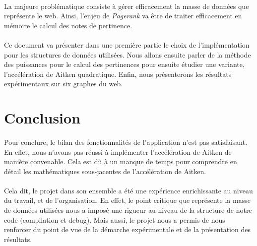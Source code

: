 		\paragraph{}La majeure problématique consiste à gérer efficacement la masse de données que représente le web. Ainsi, l'enjeu de \textit{Pagerank} va être de traiter efficacement en mémoire le calcul des notes de pertinence.
		\paragraph{}Ce document va présenter dans une première partie le choix de l'implémentation pour les structures de données utilisées. Nous allons ensuite parler de la méthode des puissances pour le calcul des pertinences pour ensuite étudier une variante, l'accélération de Aitken quadratique. Enfin, nous présenterons les résultats expérimentaux sur six graphes du web.
		
	
	
	
	
	
	\section*{Conclusion}
		\paragraph{}Pour conclure, le bilan des fonctionnalités de l'application n'est pas satisfaisant. En effet, nous n'avons pas réussi à implémenter l'accélération de Aitken de manière convenable. Cela est dû à un manque de temps pour comprendre en détail les mathématiques sous-jacentes de l'accélération de Aitken.
		\paragraph{}Cela dit, le projet dans son ensemble a été une expérience enrichissante au niveau du travail, et de l'organisation. En effet, le point critique que représente la masse de données utilisées nous a imposé une rigueur au niveau de la structure de notre code (compilation et debug). Mais aussi, le projet nous a permis de nous renforcer du point de vue de la démarche expérimentale et de la présentation des résultats.
		
		

